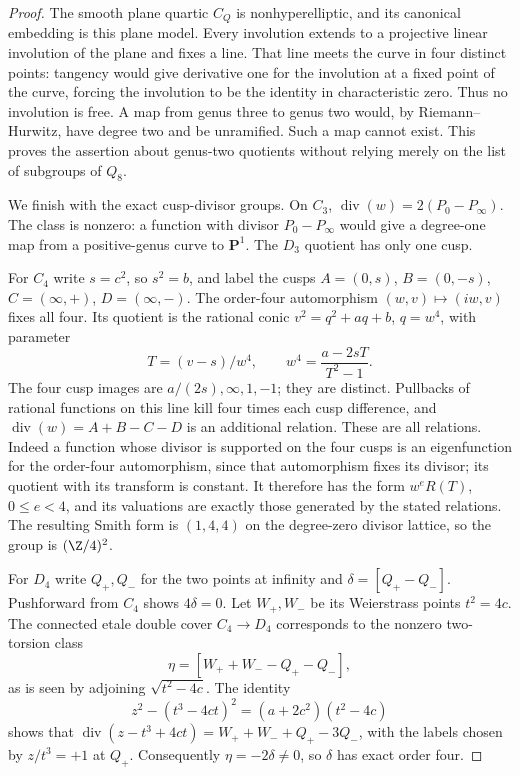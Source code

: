 \begin{proof}
The smooth plane quartic $C_Q$ is nonhyperelliptic, and its canonical
embedding is this plane model. Every involution extends to a
projective linear involution of the plane and fixes a line. That
line meets the curve in four distinct points: tangency would give
derivative one for the involution at a fixed point of the curve,
forcing the involution to be the identity in characteristic zero.
Thus no involution is free. A map from genus three to genus two
would, by Riemann--Hurwitz, have degree two and be unramified.
Such a map cannot exist. This proves the assertion about genus-two
quotients without relying merely on the list of subgroups of $Q_8$.

We finish with the exact cusp-divisor groups. On $C_3$,
$\operatorname{div}(w)=2(P_0-P_\infty)$. The class is nonzero:
a function with divisor $P_0-P_\infty$ would give a degree-one map
from a positive-genus curve to $\mathbf P^1$. The $D_3$ quotient
has only one cusp.

For $C_4$ write $s=c^2$, so $s^2=b$, and label the cusps
$A=(0,s)$, $B=(0,-s)$, $C=(\infty,+)$, $D=(\infty,-)$.
The order-four automorphism $(w,v)\mapsto(iw,v)$ fixes all four.
Its quotient is the rational conic $v^2=q^2+aq+b$, $q=w^4$,
with parameter
\[
 T=(v-s)/w^4,\qquad w^4=\frac{a-2sT}{T^2-1}.
\]
The four cusp images are $a/(2s),\infty,1,-1$; they are distinct.
Pullbacks of rational functions on this line kill four times each
cusp difference, and
$\operatorname{div}(w)=A+B-C-D$ is an additional relation.
These are all relations. Indeed a function whose divisor is
supported on the four cusps is an eigenfunction for the order-four
automorphism, since that automorphism fixes its divisor; its
quotient with its transform is constant. It therefore has the form
$w^e R(T)$, $0\le e<4$, and its valuations are exactly those
generated by the stated relations. The resulting Smith form is
$(1,4,4)$ on the degree-zero divisor lattice, so the group is
$(\Z/4)^2$.

For $D_4$ write $Q_+,Q_-$ for the two points at infinity and
$\delta=[Q_+-Q_-]$. Pushforward from $C_4$ shows $4\delta=0$.
Let $W_+,W_-$ be its Weierstrass points $t^2=4c$.
The connected etale double cover $C_4\to D_4$ corresponds to
the nonzero two-torsion class
\[
 \eta=[W_++W_--Q_+-Q_-],
\]
as is seen by adjoining $\sqrt{t^2-4c}$. The identity
\[
 z^2-(t^3-4ct)^2=(a+2c^2)(t^2-4c)
\]
shows that
$\operatorname{div}(z-t^3+4ct)=W_++W_-+Q_+-3Q_-$,
with the labels chosen by $z/t^3=+1$ at $Q_+$.
Consequently $\eta=-2\delta\ne0$, so $\delta$ has exact order four.


\end{proof}
